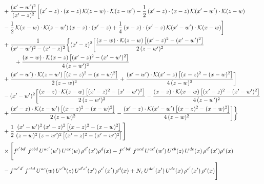 \begin{align}
&+\frac{(x^{\prime}-w^{\prime})^{2}}{(x^{\prime}-z)^{2}}\bigg[(x^{\prime}-z)\cdot(x-z)\,\mathcal{K}(z-w)\cdot\mathcal{K}(z-w^{\prime})-\frac{1}{2}\,(x^{\prime}-z)\cdot(x-z)\,\mathcal{K}(x^{\prime}-w^{\prime})\cdot\mathcal{K}(z-w)\notag \\ & -\frac{1}{2}\,\mathcal{K}(x-w)\cdot\mathcal{K}(z-w^{\prime})\,(x-z)\cdot(x^{\prime}-z)+\frac{1}{4}\,(x-z)\cdot(x^{\prime}-z)\,\mathcal{K}(x^{\prime}-w^{\prime})\cdot\mathcal{K}(x-w)\bigg]\notag\\
&+\frac{1}{(x^{\prime}-w^{\prime})^{2}-(x^{\prime}-z)^{2}}\bigg\{(x^{\prime}-z)^{2}\bigg[\frac{(x-w)\cdot\mathcal{K}(z-w)\,\big[(x^{\prime}-z)^{2}-(x^{\prime}-w^{\prime})^{2}\big]}{2\,(z-w^{\prime})^{2}}\notag\\ &\qquad+\frac{(x-w)\cdot\mathcal{K}(x-z)\,\big[(x^{\prime}-z)^{2}-(x^{\prime}-w^{\prime})^{2}\big]}{4\,(z-w^{\prime})^{2}}\notag \\ & +\frac{(x^{\prime}-w^{\prime})\cdot\mathcal{K}(z-w^{\prime})\,\big[(x-z)^{2}-(x-w)^{2}\big]}{2\,(z-w)^{2}}+\frac{(x^{\prime}-w^{\prime})\cdot\mathcal{K}(x^{\prime}-z)\,\big[(x-z)^{2}-(x-w)^{2}\big]}{4\,(z-w)^{2}}\bigg]\notag\\
&-(x^{\prime}-w^{\prime})^{2}\bigg[\frac{(x-z)\cdot\mathcal{K}(z-w)\,\big[(x^{\prime}-z)^{2}-(x^{\prime}-w^{\prime})^{2}\big]}{2\,(z-w^{\prime})^{2}}-\frac{(x-z)\cdot\mathcal{K}(x-w)\,\big[(x^{\prime}-z)^{2}-(x^{\prime}-w^{\prime})^{2}\big]}{4\,(z-w^{\prime})^{2}}\notag \\ & +\frac{(x^{\prime}-z)\cdot\mathcal{K}(z-w^{\prime})\,\big[(x-z)^{2}-(x-w)^{2}\big]}{2\,(z-w)^{2}}-\frac{(x^{\prime}-z)\cdot\mathcal{K}(x^{\prime}-w^{\prime})\,\big[(x-z)^{2}-(x-w)^{2}\big]}{4\,(z-w)^{2}}\bigg]\bigg\}\notag\\
&+\frac{1}{2}\,\frac{(x^{\prime}-w^{\prime})^{2}\,(x^{\prime}-z)^{2}\,\big[(x-z)^{2}-(x-w)^{2}\big]}{(z-w)^{2}\,(z-w^{\prime})^{2}\,\big[(x^{\prime}-z)^{2}-(x^{\prime}-w^{\prime})^{2}\big]}\Bigg]\notag\\
&\times\Bigg[f^{c^{\prime}bd^{\prime}}\,f^{cbd}\, U^{ac^{\prime}}(w^{\prime})\,U^{ac}(w)\,\rho^{d^{\prime}}(x^{\prime})\rho^{d}(x)- f^{c^{\prime}bd^{\prime}}\,f^{acd}\,U^{ac^{\prime}}(w^{\prime})\,U^{cb}(z)\,U^{de}(x)\,\rho^{d^{\prime}}(x^{\prime})\rho^{e}(x) \notag \\ & -f^{ac^{\prime}d^{\prime}}\,f^{cbd}\,U^{ac}(w)\,U^{c^{\prime}b}(z)\,U^{d^{\prime}e^{\prime}}(x^{\prime})\,\rho^{e^{\prime}}(x^{\prime})\,\rho^{d}(x) +N_{c}\,U^{de^{\prime}}(x^{\prime})\,U^{de}(x)\,\rho^{e^{\prime}}(x^{\prime})\,\rho^{e}(x)\Bigg]\label{eq:B-II2d}\\

\end{align}
